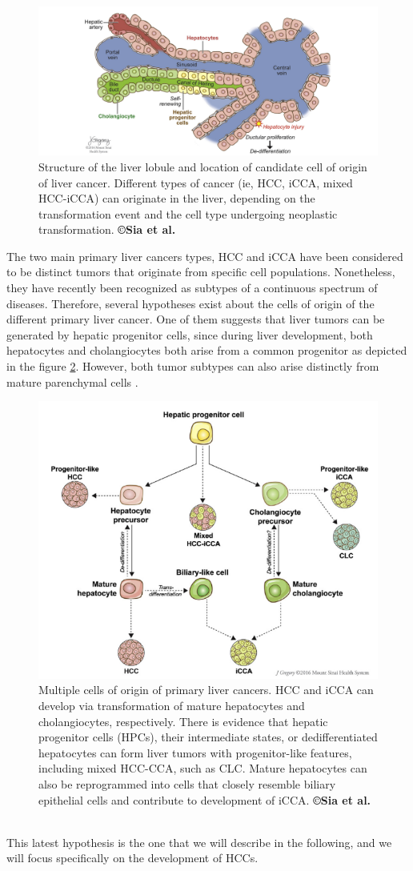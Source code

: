 \begin{figure}[th!]
\centering
\includegraphics[width=0.7\linewidth]{images/image8}
\caption{Structure of the liver lobule and location of candidate cell of origin of liver cancer. Different types of cancer (ie, HCC, iCCA, mixed HCC-iCCA) can originate in the liver, depending on the transformation event and the cell type undergoing neoplastic transformation. \textbf{©Sia et al.} \cite{Sia2017}}
\label{Sia2017_Fig2}
\end{figure}
The two main primary liver cancers types, HCC and iCCA
have been considered to be distinct tumors that originate from specific
cell populations. Nonetheless, they have recently been recognized as
subtypes of a continuous spectrum of diseases. Therefore, several
hypotheses exist about the cells of origin of the different primary
liver cancer.
One of them suggests that liver tumors can be generated by hepatic
progenitor cells, since during liver development, both hepatocytes and
cholangiocytes both arise from a common progenitor as depicted in the figure \ref{Sia2017_Fig3}.
However, both tumor subtypes can also arise distinctly from mature
parenchymal cells \cite{Sia2017}.
\begin{figure}[th!]
\centering
\includegraphics[width=0.5\linewidth]{images/image13}
\caption{Multiple cells of origin of primary liver cancers. HCC and iCCA can develop via transformation of mature hepatocytes and cholangiocytes, respectively. There is evidence that hepatic progenitor cells (HPCs), their intermediate states, or dedifferentiated hepatocytes can form liver tumors with progenitor-like features, including mixed HCC-CCA, such as CLC. Mature hepatocytes can also be reprogrammed into cells that closely resemble biliary epithelial cells and contribute to development of iCCA. \textbf{©Sia et al.} \cite{Sia2017}}
\label{Sia2017_Fig3}
\end{figure}\\
This latest hypothesis is the one that we will describe in the
following, and we will focus specifically on the development of
HCCs.

